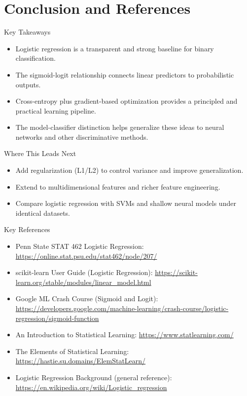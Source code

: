 \documentclass[10pt]{beamer}
\begin{document}
\section{Conclusion and References}

\begin{frame}{Key Takeaways}
  \justifying
  \begin{itemize}
    \item Logistic regression is a transparent and strong baseline for binary classification.
    \item The sigmoid-logit relationship connects linear predictors to probabilistic outputs.
    \item Cross-entropy plus gradient-based optimization provides a principled and practical learning pipeline.
    \item The model-classifier distinction helps generalize these ideas to neural networks and other discriminative methods.
  \end{itemize}
\end{frame}

\begin{frame}{Where This Leads Next}
  \justifying
  \begin{itemize}
    \item Add regularization (L1/L2) to control variance and improve generalization.
    \item Extend to multidimensional features and richer feature engineering.
    \item Compare logistic regression with SVMs and shallow neural models under identical datasets.
  \end{itemize}
\end{frame}

\begin{frame}{Key References}
  \justifying
  \begin{itemize}
    \item Penn State STAT 462 Logistic Regression: \url{https://online.stat.psu.edu/stat462/node/207/}
    \item scikit-learn User Guide (Logistic Regression): \url{https://scikit-learn.org/stable/modules/linear_model.html}
    \item Google ML Crash Course (Sigmoid and Logit): \url{https://developers.google.com/machine-learning/crash-course/logistic-regression/sigmoid-function}
    \item An Introduction to Statistical Learning: \url{https://www.statlearning.com/}
    \item The Elements of Statistical Learning: \url{https://hastie.su.domains/ElemStatLearn/}
    \item Logistic Regression Background (general reference): \url{https://en.wikipedia.org/wiki/Logistic_regression}
  \end{itemize}
\end{frame}
\end{document}
